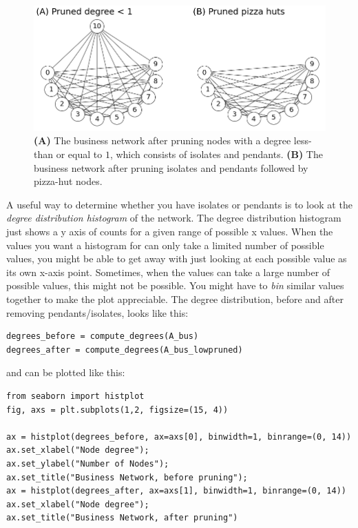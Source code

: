 \begin{figure}[h]
    \centering
    \includegraphics[width=\linewidth]{representations/ch4/Images/nodeprune.png}
    \caption[Pruning high and low degree nodes]{\textbf{(A)} The business network after pruning nodes with a degree less-than or equal to $1$, which consists of isolates and pendants. \textbf{(B)} The business network after pruning isolates and pendants followed by pizza-hut nodes.}
    \label{fig:ch4:nodeprune}
\end{figure}

A useful way to determine whether you have isolates or pendants is to look at the \emph{degree distribution histogram} of the network. The degree distribution histogram just shows a y axis of counts for a given range of possible x values. When the values you want a histogram for can only take a limited number of possible values, you might be able to get away with just looking at each possible value as its own x-axis point. Sometimes, when the values can take a large number of possible values, this might not be possible. You might have to \emph{bin} similar values together to make the plot appreciable. The degree distribution, before and after removing pendants/isolates, looks like this:

\begin{lstlisting}[style=python]
degrees_before = compute_degrees(A_bus)
degrees_after = compute_degrees(A_bus_lowpruned)
\end{lstlisting}

and can be plotted like this:

\begin{lstlisting}[style=python]
from seaborn import histplot
fig, axs = plt.subplots(1,2, figsize=(15, 4))

ax = histplot(degrees_before, ax=axs[0], binwidth=1, binrange=(0, 14))
ax.set_xlabel("Node degree");
ax.set_ylabel("Number of Nodes");
ax.set_title("Business Network, before pruning");
ax = histplot(degrees_after, ax=axs[1], binwidth=1, binrange=(0, 14))
ax.set_xlabel("Node degree");
ax.set_title("Business Network, after pruning")
\end{lstlisting}

